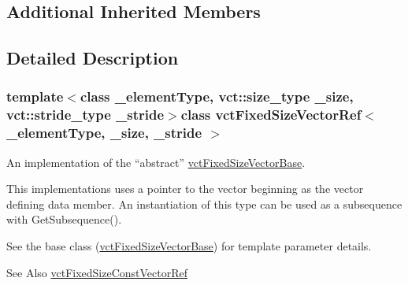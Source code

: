\subsection*{Additional Inherited Members}


\subsection{Detailed Description}
\subsubsection*{template$<$class \-\_\-element\-Type, vct\-::size\-\_\-type \-\_\-size, vct\-::stride\-\_\-type \-\_\-stride$>$class vct\-Fixed\-Size\-Vector\-Ref$<$ \-\_\-element\-Type, \-\_\-size, \-\_\-stride $>$}

An implementation of the ``abstract'' \hyperlink{classvct_fixed_size_vector_base}{vct\-Fixed\-Size\-Vector\-Base}. 

This implementations uses a pointer to the vector beginning as the vector defining data member. An instantiation of this type can be used as a subsequence with Get\-Subsequence().

See the base class (\hyperlink{classvct_fixed_size_vector_base}{vct\-Fixed\-Size\-Vector\-Base}) for template parameter details.

\begin{DoxySeeAlso}{See Also}
\hyperlink{classvct_fixed_size_const_vector_ref}{vct\-Fixed\-Size\-Const\-Vector\-Ref} 
\end{DoxySeeAlso}


